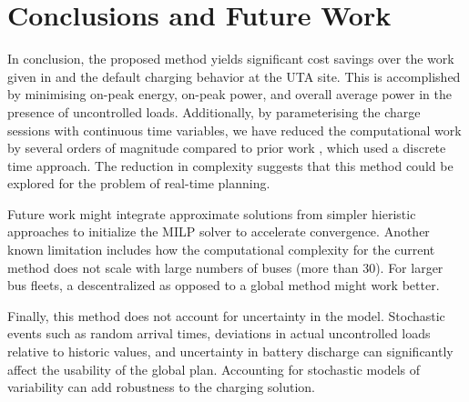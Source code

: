 \section{Conclusions and Future Work }
In conclusion, the proposed method yields significant cost savings over the work given in \cite{He_2019_Fast} and the default charging behavior at the UTA site. This is accomplished by minimising on-peak energy, on-peak power, and overall average power in the presence of uncontrolled loads. Additionally, by parameterising the charge sessions with continuous time variables, we have reduced the computational work by several orders of magnitude compared to prior work \cite{mortensen_comprehensive_2021}, which used a discrete time approach. The reduction in complexity suggests that this method could be explored for the problem of real-time planning. 
\par Future work might integrate approximate solutions from simpler hieristic approaches to initialize the MILP solver to accelerate convergence. Another known limitation includes how the computational complexity for the current method does not scale with large numbers of buses (more than 30). For larger bus fleets, a descentralized as opposed to a global method might work better. 
\par Finally, this method does not account for uncertainty in the model.  Stochastic events such as random arrival times, deviations in actual uncontrolled loads relative to historic values, and uncertainty in battery discharge can significantly affect the usability of the global plan. Accounting for stochastic models of variability can add robustness to the charging solution. 

